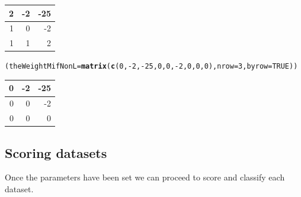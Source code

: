 \documentclass[a4paper,10pt]{article}\usepackage[]{graphicx}\usepackage[]{color}
\makeatletter
\newcommand{\hlnum}[1]{\textcolor[rgb]{0.686,0.059,0.569}{#1}}%
\newcommand{\hlopt}[1]{\textcolor[rgb]{0,0,0}{#1}}%
\newcommand{\hlstd}[1]{\textcolor[rgb]{0.345,0.345,0.345}{#1}}%
\newcommand{\hlkwb}[1]{\textcolor[rgb]{0.69,0.353,0.396}{#1}}%
\newcommand{\hlkwc}[1]{\textcolor[rgb]{0.333,0.667,0.333}{#1}}%
\newcommand{\hlkwd}[1]{\textcolor[rgb]{0.737,0.353,0.396}{\textbf{#1}}}%
\newenvironment{kframe}{%
 \def\at@end@of@kframe{}%
 \ifinner\ifhmode%
  \def\at@end@of@kframe{\end{minipage}}%
  \begin{minipage}{\columnwidth}%
 \fi\fi%
 \def\FrameCommand##1{\hskip\@totalleftmargin \hskip-\fboxsep
 \colorbox{shadecolor}{##1}\hskip-\fboxsep
     \hskip-\linewidth \hskip-\@totalleftmargin \hskip\columnwidth}%
 \MakeFramed {\advance\hsize-\width
   \@totalleftmargin\z@ \linewidth\hsize
   \@setminipage}}%
 {\par\unskip\endMakeFramed%
 \at@end@of@kframe}
\newenvironment{knitrout}{}{} %
\makeatother
\begin{document}
\begin{knitrout}
\begin{tabular}{r|r|r}
\hline
2 & -2 & -25\\
\hline
1 & 0 & -2\\
\hline
1 & 1 & 2\\
\hline
\end{tabular}\begin{kframe}\begin{alltt}
\hlstd{(theWeightMifNonL}\hlkwb{=}\hlkwd{matrix} \hlstd{(}\hlkwd{c}\hlstd{(}\hlnum{0}\hlstd{,}\hlopt{-}\hlnum{2}\hlstd{,}\hlopt{-}\hlnum{25}\hlstd{,}\hlnum{0}\hlstd{,}\hlnum{0}\hlstd{,}\hlopt{-}\hlnum{2}\hlstd{,}\hlnum{0}\hlstd{,}\hlnum{0}\hlstd{,}\hlnum{0}\hlstd{),} \hlkwc{nrow}\hlstd{=}\hlnum{3}\hlstd{,} \hlkwc{byrow}\hlstd{=}\hlnum{TRUE}\hlstd{))}
\end{alltt}
\end{kframe}


\begin{tabular}{r|r|r}
\hline
0 & -2 & -25\\
\hline
0 & 0 & -2\\
\hline
0 & 0 & 0\\
\hline
\end{tabular}
\end{knitrout}


\subsection{Scoring datasets}

Once the parameters have been set we can proceed to score and classify each dataset.
\end{document}
